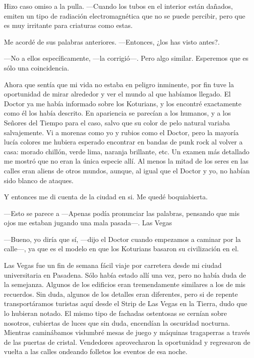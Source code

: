 Hizo caso omiso a la pulla. ---Cuando los tubos en el interior están
dañados, emiten un tipo de radiación electromagnética que no se puede
percibir, pero que es muy irritante para criaturas como estas.

Me acordé de sus palabras anteriores. ---Entonces, ¿los has visto
antes?.

---No a ellos específicamente, ---la corrigió---. Pero algo similar.
Esperemos que es sólo una coincidencia.

Ahora que sentía que mi vida no estaba en peligro inminente, por fin
tuve la oportunidad de mirar alrededor y ver el mundo al que habíamos
llegado. El Doctor ya me había informado sobre los Koturians, y los
encontré exactamente como él los había descrito. En apariencia se
parecían a los humanos, y a los Señores del Tiempo para el caso, salvo
que su color de pelo natural variaba salvajemente. Vi a morenas como yo
y rubios como el Doctor, pero la mayoría lucía colores me hubiera
esperado encontrar en bandas de punk rock al volver a casa: morado
chillón, verde lima, naranja brillante, etc. Un examen más detallado me
mostró que no eran la única especie allí. Al menos la mitad de los seres
en las calles eran aliens de otros mundos, aunque, al igual que el
Doctor y yo, no habían sido blanco de ataques.

Y entonces me di cuenta de la ciudad en si. Me quedé boquiabierta.

---Esto se parece a ---Apenas podía pronunciar las palabras, pensando
que mis ojos me estaban jugando una mala pasada---. Las Vegas

---Bueno, yo diría que sí, ---dijo el Doctor cuando empezamos a caminar
por la calle---, ya que es el modelo en que los Koturians basaron su
civilización en el.

Las Vegas fue un fin de semana fácil viaje por carretera desde mi ciudad
universitaria en Pasadena. Sólo había estado allí una vez, pero no había
duda de la semejanza. Algunos de los edificios eran tremendamente
similares a los de mis recuerdos. Sin duda, algunos de los detalles eran
diferentes, pero si de repente transportáramos turistas aquí desde el
Strip de Las Vegas en la Tierra, dudo que lo hubieran notado. El mismo
tipo de fachadas ostentosas se cernían sobre nosotros, cubiertas de
luces que sin duda, encendían la oscuridad nocturna. Mientras
caminábamos vislumbré mesas de juego y máquinas tragaperras a través de
las puertas de cristal. Vendedores aprovecharon la oportunidad y
regresaron de vuelta a las calles ondeando folletos los eventos de esa
noche.

